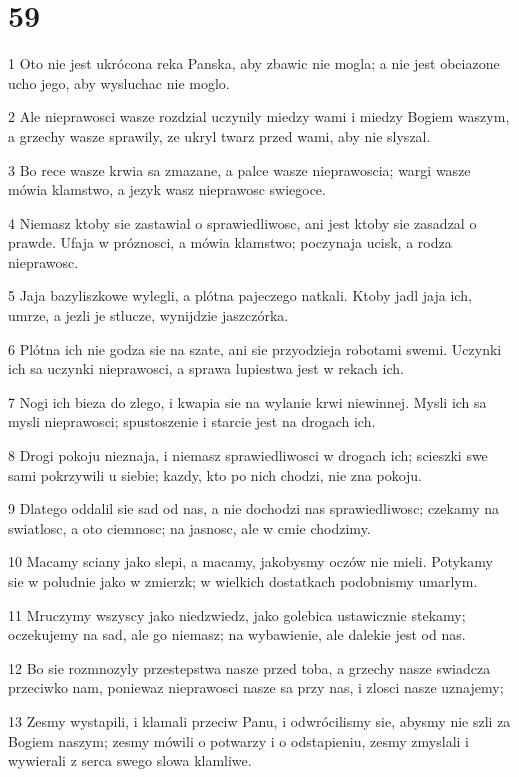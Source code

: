 \chapter{59}

\par 1 Oto nie jest ukrócona reka Panska, aby zbawic nie mogla; a nie jest obciazone ucho jego, aby wysluchac nie moglo.
\par 2 Ale nieprawosci wasze rozdzial uczynily miedzy wami i miedzy Bogiem waszym, a grzechy wasze sprawily, ze ukryl twarz przed wami, aby nie slyszal.
\par 3 Bo rece wasze krwia sa zmazane, a palce wasze nieprawoscia; wargi wasze mówia klamstwo, a jezyk wasz nieprawosc swiegoce.
\par 4 Niemasz ktoby sie zastawial o sprawiedliwosc, ani jest ktoby sie zasadzal o prawde. Ufaja w próznosci, a mówia klamstwo; poczynaja ucisk, a rodza nieprawosc.
\par 5 Jaja bazyliszkowe wylegli, a plótna pajeczego natkali. Ktoby jadl jaja ich, umrze, a jezli je stlucze, wynijdzie jaszczórka.
\par 6 Plótna ich nie godza sie na szate, ani sie przyodzieja robotami swemi. Uczynki ich sa uczynki nieprawosci, a sprawa lupiestwa jest w rekach ich.
\par 7 Nogi ich bieza do zlego, i kwapia sie na wylanie krwi niewinnej. Mysli ich sa mysli nieprawosci; spustoszenie i starcie jest na drogach ich.
\par 8 Drogi pokoju nieznaja, i niemasz sprawiedliwosci w drogach ich; scieszki swe sami pokrzywili u siebie; kazdy, kto po nich chodzi, nie zna pokoju.
\par 9 Dlatego oddalil sie sad od nas, a nie dochodzi nas sprawiedliwosc; czekamy na swiatlosc, a oto ciemnosc; na jasnosc, ale w cmie chodzimy.
\par 10 Macamy sciany jako slepi, a macamy, jakobysmy oczów nie mieli. Potykamy sie w poludnie jako w zmierzk; w wielkich dostatkach podobnismy umarlym.
\par 11 Mruczymy wszyscy jako niedzwiedz, jako golebica ustawicznie stekamy; oczekujemy na sad, ale go niemasz; na wybawienie, ale dalekie jest od nas.
\par 12 Bo sie rozmnozyly przestepstwa nasze przed toba, a grzechy nasze swiadcza przeciwko nam, poniewaz nieprawosci nasze sa przy nas, i zlosci nasze uznajemy;
\par 13 Zesmy wystapili, i klamali przeciw Panu, i odwrócilismy sie, abysmy nie szli za Bogiem naszym; zesmy mówili o potwarzy i o odstapieniu, zesmy zmyslali i wywierali z serca swego slowa klamliwe.
